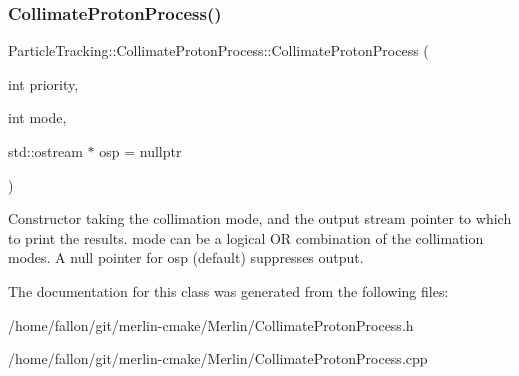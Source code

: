 \subsubsection{\texorpdfstring{Collimate\+Proton\+Process()}{CollimateProtonProcess()}}
{\footnotesize\ttfamily Particle\+Tracking\+::\+Collimate\+Proton\+Process\+::\+Collimate\+Proton\+Process (\begin{DoxyParamCaption}\item[{int}]{priority,  }\item[{int}]{mode,  }\item[{std\+::ostream $\ast$}]{osp = {\ttfamily nullptr} }\end{DoxyParamCaption})}

Constructor taking the collimation mode, and the output stream pointer to which to print the results. mode can be a logical OR combination of the collimation modes. A null pointer for osp (default) suppresses output. 

The documentation for this class was generated from the following files\+:\begin{DoxyCompactItemize}
\item 
/home/fallon/git/merlin-\/cmake/\+Merlin/Collimate\+Proton\+Process.\+h\item 
/home/fallon/git/merlin-\/cmake/\+Merlin/Collimate\+Proton\+Process.\+cpp\end{DoxyCompactItemize}
